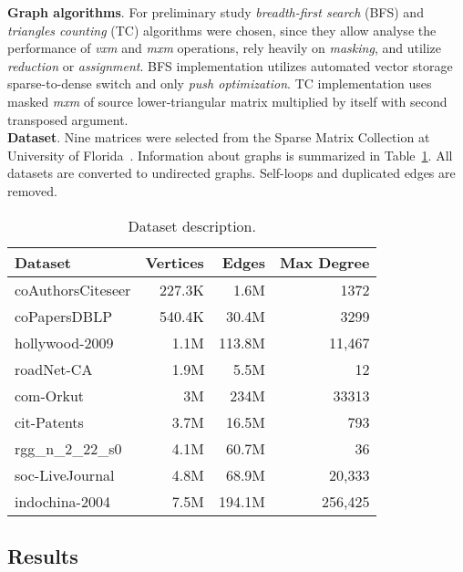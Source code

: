 \textbf{Graph algorithms}. For preliminary study \textit{breadth-first search} (BFS) and \textit{triangles counting} (TC) algorithms were chosen, since they allow analyse the performance of \textit{vxm} and \textit{mxm} operations, rely heavily on \textit{masking}, and utilize \textit{reduction} or \textit{assignment}. BFS implementation utilizes automated vector storage sparse-to-dense switch and only \textit{push optimization}. TC implementation uses masked \textit{mxm} of source lower-triangular matrix multiplied by itself with second transposed argument.\\

\textbf{Dataset}. Nine matrices were selected from the Sparse Matrix Collection at University of Florida~\cite{dataset:sparse_matrix_collection}. Information about graphs is summarized in Table~\ref{dataset:info}. All datasets are converted to undirected graphs. Self-loops and duplicated edges are removed.\\

\begin{table}[tbp]
\caption{Dataset description.} 
\begin{center}
    \begin{tabular}{|l|r|r|r|}
    \hline
    Dataset & Vertices  & Edges & Max Degree \\
    \hline
    \hline
    coAuthorsCiteseer & 227.3K &   1.6M &    1372 \\
    coPapersDBLP      & 540.4K &  30.4M &    3299 \\
    hollywood-2009    &   1.1M & 113.8M &  11,467 \\
    roadNet-CA        &   1.9M &   5.5M &      12 \\
    com-Orkut         &     3M &   234M &   33313 \\
    cit-Patents       &   3.7M &  16.5M &     793 \\
    rgg\_n\_2\_22\_s0 &   4.1M &  60.7M &      36 \\
    soc-LiveJournal   &   4.8M &  68.9M &  20,333 \\
    indochina-2004    &   7.5M & 194.1M & 256,425 \\
    \hline
    \end{tabular}
    \label{dataset:info}
\end{center}
\end{table}

\subsection{Results}

